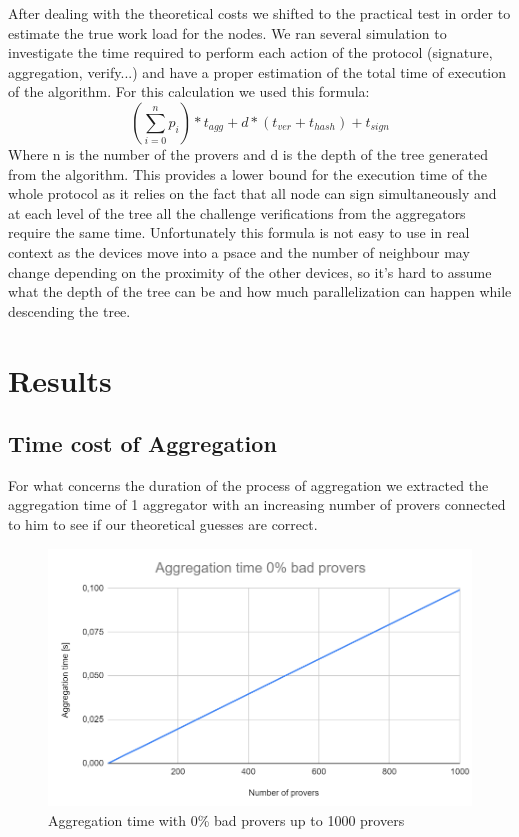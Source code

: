 \documentclass[10pt, a4paper, twocolumn]{article} %
\begin{document}
After dealing with the theoretical costs we shifted to the practical test in order to estimate the true work load for the nodes.
We ran several simulation to investigate the time required to perform each action of the protocol (signature, aggregation, verify...) and have a proper estimation of the total time of execution of the algorithm.
For this calculation we used this formula:
\[(\sum_{i=0}^{n} p_i) * t_{agg} + d * (t_{ver} + t_{hash}) + t_{sign} \]
Where n is the number of the provers and d is the depth of the tree generated from the algorithm.
This provides a lower bound for the execution time of the whole protocol as it relies on the fact that all node can sign simultaneously and at each level of the tree all the challenge verifications from the aggregators require the same time.
Unfortunately this formula is not easy to use in real context as the devices move into a psace and the number of neighbour may change depending on the proximity of the other devices, so it's hard to assume what the depth of the tree can be and how much parallelization can happen while descending the tree.

\section{Results}
\label{sec:results}
\subsection{Time cost of Aggregation}
For what concerns the duration of the process of aggregation we extracted the aggregation time of 1 aggregator with an increasing number of provers connected to him to see if our theoretical guesses are correct.
\begin{figure}
	\includegraphics[width=\linewidth]{images/aggregation_0.png} %
	\caption{Aggregation time with 0\% bad provers up to 1000 provers} %
	\label{bear} %
\end{figure}
\end{document}
